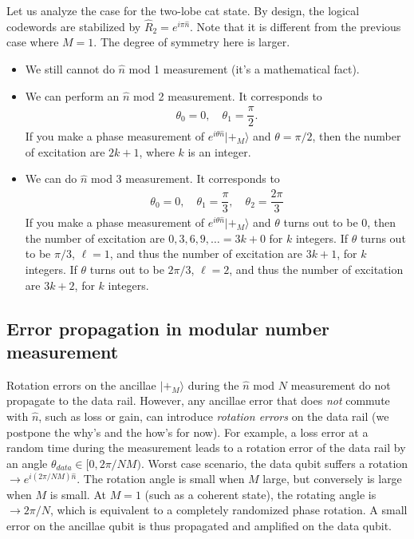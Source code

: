 \documentclass{article}
\begin{document}
Let us analyze the case for the two-lobe cat state. By design, the logical codewords are stabilized by $\hat{R}_2=e^{i\pi\hat{n}}$. Note that it is different from the previous case where $M=1$. The degree of symmetry here is larger.
\begin{itemize}
    \item We still cannot do $\hat{n}$ mod 1 measurement (it's a mathematical fact).
    \item We can perform an $\hat{n}$ mod 2 measurement. It corresponds to 
        \begin{align}
            \theta_0=0,\quad\theta_1=\dfrac{\pi}{2}.
        \end{align}
        If you make a phase measurement of $e^{i\theta\hat{n}}|+_M\rangle$ and $\theta=\pi/2$, then the number of excitation are $2k+1$, where $k$ is an integer.
    \item We can do $\hat{n}$ mod 3 measurement. It corresponds to
        \begin{align}
            \theta_0=0,\quad\theta_1=\dfrac{\pi}{3},\quad\theta_2=\dfrac{2\pi}{3}
        \end{align}
        If you make a phase measurement of $e^{i\theta\hat{n}}|+_M\rangle$ and $\theta$ turns out to be 0, then the number of excitation are $0, 3, 6, 9,\dots=3k+0$ for $k$ integers. If $\theta$ turns out to be $\pi/3$, $\ell=1$, and thus the number of excitation are $3k+1$, for $k$ integers. If $\theta$ turns out to be $2\pi/3$, $\ell=2$, and thus the number of excitation are $3k+2$, for $k$ integers.  
\end{itemize}
\subsection*{Error propagation in modular number measurement}
Rotation errors on the ancillae $|+_M\rangle$ during the $\hat{n}$ mod $N$ measurement do not propagate to the data rail. However, any ancillae error that does \textit{not} commute with $\hat{n}$, such as loss or gain, can introduce \textit{rotation errors} on the data rail (we postpone the why's and the how's for now). For example, a loss error at a random time during the measurement leads to a rotation error of the data rail by an angle $\theta_{data}\in [0, 2\pi/NM)$. Worst case scenario, the data qubit suffers a rotation $\to e^{i(2\pi/NM)\hat{n}}$. The rotation angle is small when $M$ large, but conversely is large when $M$ is small. At $M=1$ (such as a coherent state), the rotating angle is $\to 2\pi/N$, which is equivalent to a completely randomized phase rotation. A small error on the ancillae qubit is thus propagated and amplified on the data qubit.
\end{document}
